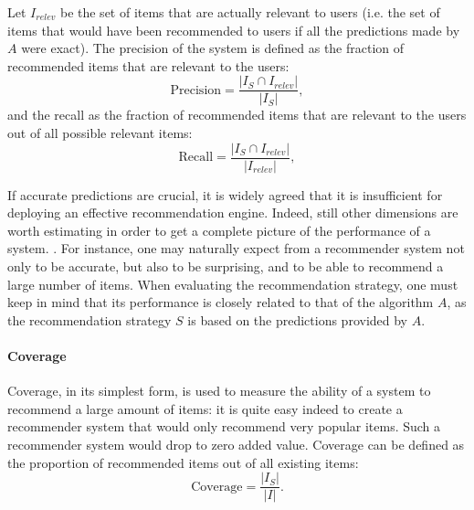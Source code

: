 Let $I_{relev}$ be the set of items that are actually relevant to users (i.e.
the set of items that would have been recommended to users if all the
predictions made by $A$ were exact). 
The precision of the system is defined as the fraction of recommended items that
are relevant to the users:
$$\text{Precision} = \frac{|I_{S} \cap I_{relev}|}{|I_{S}|},$$
and the recall as the fraction of recommended items that are relevant to the
users out of all possible relevant items:
$$\text{Recall} = \frac{|I_{S} \cap I_{relev}|}{|I_{relev}|},$$

If accurate predictions are crucial, it is widely agreed that it is
insufficient for deploying an effective recommendation engine. Indeed, still
other dimensions are worth estimating in order to get a complete picture of the
performance of a system.
\cite{NeeRieKonACM2006,HerKonJohTerRieACM2004,KamBriRecSys2014}.
For instance, one may naturally expect from a recommender system
not only to be accurate, but also to be surprising, and to be able to recommend
a large number of items. When evaluating the recommendation strategy, one must
keep in mind that its performance is closely related to that of the algorithm
$A$, as the recommendation strategy $S$ is based on the predictions provided by
$A$.


\paragraph{Coverage\\}
Coverage, in its simplest form, is used to measure the ability of a system to
recommend a large amount of items: it is quite easy indeed to create a
recommender system that would only recommend very popular items. Such a
recommender system would drop to zero added value. Coverage can be defined as the
proportion of recommended items out of all existing items:
$$\text{Coverage} = \frac{|I_{S}|}{|I|}.$$



